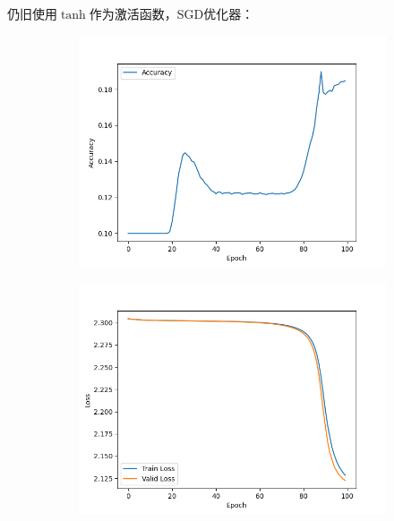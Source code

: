 \documentclass[11pt, a4paper]{article}
\begin{document}
\section{}
\subsection{}
仍旧使用$\tanh$作为激活函数，SGD优化器：
\begin{figure}[H]
    \hfill
    \begin{subfigure}[t]{0.45\linewidth}
        \includegraphics[width=\textwidth]{img/Q4/1/Acc.png}
    \end{subfigure}
    \hfill
    \begin{subfigure}[t]{0.45\linewidth}
        \includegraphics[width=\textwidth]{img/Q4/1/Loss.png}
    \end{subfigure}
    \hfill
\end{figure}
\end{document}
